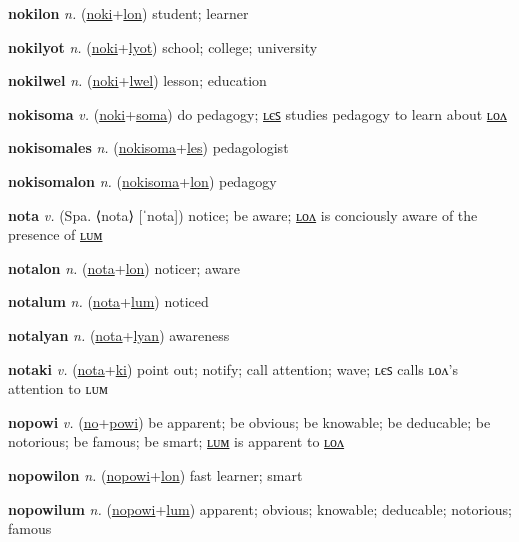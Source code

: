 \textbf{\hypertarget{nokilon}{nokilon}} \textit{n.} (\hyperlink{noki}{noki}+\allowbreak \hyperlink{lon}{lon})
student; learner

\textbf{\hypertarget{nokilyot}{nokilyot}} \textit{n.} (\hyperlink{noki}{noki}+\allowbreak \hyperlink{lyot}{lyot})
school; college; university

\textbf{\hypertarget{nokilwel}{nokilwel}} \textit{n.} (\hyperlink{noki}{noki}+\allowbreak \hyperlink{lwel}{lwel})
lesson; education

\textbf{\hypertarget{nokisoma}{nokisoma}} \textit{v.} (\hyperlink{noki}{noki}+\allowbreak \hyperlink{soma}{soma})
do pedagogy; \hyperlink{nokisomales}{ʟєꜱ} studies pedagogy to learn about \hyperlink{nokisomalon}{ʟᴏᴧ}

\textbf{\hypertarget{nokisomales}{nokisomales}} \textit{n.} (\hyperlink{nokisoma}{nokisoma}+\allowbreak \hyperlink{les}{les})
pedagologist

\textbf{\hypertarget{nokisomalon}{nokisomalon}} \textit{n.} (\hyperlink{nokisoma}{nokisoma}+\allowbreak \hyperlink{lon}{lon})
pedagogy

\textbf{\hypertarget{nota}{nota}} \textit{v.} (Spa. ⟨nota⟩ [ˈnota])
notice; be aware; \hyperlink{notalon}{ʟᴏᴧ} is conciously aware of the presence of \hyperlink{notalum}{ʟᴜᴍ}

\textbf{\hypertarget{notalon}{notalon}} \textit{n.} (\hyperlink{nota}{nota}+\allowbreak \hyperlink{lon}{lon})
noticer; aware

\textbf{\hypertarget{notalum}{notalum}} \textit{n.} (\hyperlink{nota}{nota}+\allowbreak \hyperlink{lum}{lum})
noticed

\textbf{\hypertarget{notalyan}{notalyan}} \textit{n.} (\hyperlink{nota}{nota}+\allowbreak \hyperlink{lyan}{lyan})
awareness

\textbf{\hypertarget{notaki}{notaki}} \textit{v.} (\hyperlink{nota}{nota}+\allowbreak \hyperlink{ki}{ki})
point out; notify; call attention; wave; ʟєꜱ calls ʟᴏᴧ’s attention to ʟᴜᴍ

\textbf{\hypertarget{nopowi}{nopowi}} \textit{v.} (\hyperlink{no}{no}+\allowbreak \hyperlink{powi}{powi})
be apparent; be obvious; be knowable; be deducable; be notorious; be famous; be smart; \hyperlink{nopowilum}{ʟᴜᴍ} is apparent to \hyperlink{nopowilon}{ʟᴏᴧ}

\textbf{\hypertarget{nopowilon}{nopowilon}} \textit{n.} (\hyperlink{nopowi}{nopowi}+\allowbreak \hyperlink{lon}{lon})
fast learner; smart

\textbf{\hypertarget{nopowilum}{nopowilum}} \textit{n.} (\hyperlink{nopowi}{nopowi}+\allowbreak \hyperlink{lum}{lum})
apparent; obvious; knowable; deducable; notorious; famous

